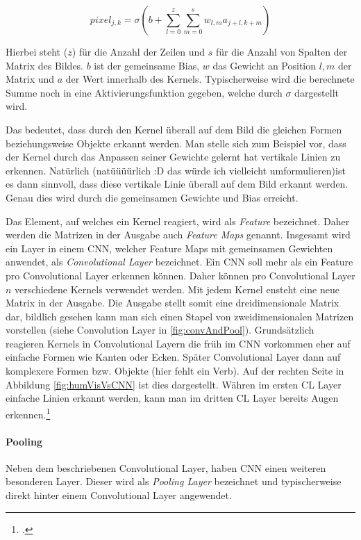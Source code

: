 \begin{equation}
    \label{eq:actSharedWeights}
    pixel_{j,k} = \sigma\left(b+\sum_{l=0}^{z} \sum_{m=0}^{s} w_{l, m} a_{j+l, k+m}\right)
\end{equation}

Hierbei steht ($z$) für die Anzahl der Zeilen und $s$ für die Anzahl von Spalten der Matrix des Bildes. $b$ ist der gemeinsame Bias, $w$ das Gewicht an Position $l,m$ der Matrix und $a$ der Wert innerhalb des Kernels. Typischerweise wird die berechnete Summe noch in eine Aktivierungsfunktion gegeben, welche durch $\sigma$ dargestellt wird.

Das bedeutet, dass durch den Kernel überall auf dem Bild die gleichen Formen beziehungsweise Objekte erkannt werden. Man stelle sich zum Beispiel vor, dass der Kernel durch das Anpassen seiner Gewichte gelernt hat vertikale Linien zu erkennen. Natürlich (natüüüürlich :D das würde ich vielleicht umformulieren)ist es dann sinnvoll, dass diese vertikale Linie überall auf dem Bild erkannt werden. Genau dies wird durch die gemeinsamen Gewichte und Bias erreicht.

Das Element, auf welches ein Kernel reagiert, wird als \textit{Feature} bezeichnet. Daher werden die Matrizen in der Ausgabe auch \textit{Feature Maps} genannt. Insgesamt wird ein Layer in einem \ac{CNN}, welcher Feature Maps mit gemeinsamen Gewichten anwendet, als \textit{Convolutional Layer} bezeichnet. Ein \ac{CNN} soll mehr als ein Feature pro Convolutional Layer erkennen können. Daher können pro Convolutional Layer $n$ verschiedene Kernels verwendet werden. Mit jedem Kernel ensteht eine neue Matrix in der Ausgabe. Die Ausgabe stellt somit eine dreidimensionale Matrix dar, bildlich gesehen kann man sich einen Stapel von zweidimensionalen Matrizen vorstellen (siehe Convolution Layer in \ref{fig:convAndPool}).
Grundsätzlich reagieren Kernels in Convolutional Layern die früh im \ac{CNN} vorkommen eher auf einfache Formen wie Kanten oder Ecken. Später Convolutional Layer dann auf komplexere Formen bzw. Objekte (hier fehlt ein Verb). Auf der rechten Seite in Abbildung \ref{fig:humVisVsCNN} ist dies dargestellt. Währen im ersten CL Layer einfache Linien erkannt werden, kann man im dritten CL Layer bereits Augen erkennen.\footcite[Vgl.][S. 169-171]{nielsenNeuralNetworksDeep2015}

\paragraph{Pooling}
Neben dem beschriebenen Convolutional Layer, haben \ac{CNN} einen weiteren besonderen Layer. Dieser wird als \textit{Pooling Layer} bezeichnet und typischerweise direkt hinter einem Convolutional Layer angewendet. 

